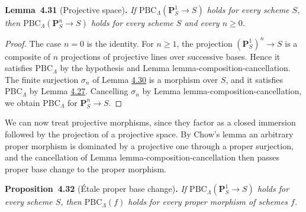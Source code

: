 \documentclass[11pt]{article}
\newenvironment{bpstatement}[2]{\par\addvspace{0.6\baselineskip}\noindent\textbf{#1}#2\textbf{.}\enspace\ignorespaces}
  {\par\addvspace{0.4\baselineskip}}
\newenvironment{bpstatementit}[2]{\begin{bpstatement}{#1}{#2}\itshape\ignorespaces}{\end{bpstatement}}
\begin{document}
\label{bp91}%
\begin{bpstatementit}{Lemma~4.31}{ (Projective space)}
If \(\mathrm{PBC}_\Lambda(\mathbf P^1_S\to S)\) holds for every scheme \(S\), then \(\mathrm{PBC}_\Lambda(\mathbf P^n_S\to S)\) holds for every scheme \(S\) and every \(n\geq0\).
\end{bpstatementit}

\begin{proof}[{Proof}]\label{bp92}%
The case \(n=0\) is the identity. For \(n\geq1\), the projection \((\mathbf P^1_S)^n\to S\) is a composite of \(n\) projections of projective lines over successive bases. Hence it satisfies \(\mathrm{PBC}_\Lambda\) by the hypothesis and Lemma lemma-composition-cancellation. The finite surjection \(\sigma_n\) of Lemma \hyperref[bp88]{4.30} is a morphism over \(S\), and it satisfies \(\mathrm{PBC}_\Lambda\) by Lemma \hyperref[bp80]{4.27}. Cancelling \(\sigma_n\) by Lemma lemma-composition-cancellation, we obtain \(\mathrm{PBC}_\Lambda\) for \(\mathbf P^n_S\to S\).
\end{proof}

\label{bp93}%
We can now treat projective morphisms, since they factor as a closed immersion followed by the projection of a projective space. By Chow's lemma an arbitrary proper morphism is dominated by a projective one through a proper surjection, and the cancellation of Lemma lemma-composition-cancellation then passes proper base change to the proper morphism.

\label{bp94}%
\begin{bpstatementit}{Proposition~4.32}{ (Étale proper base change)}
If \(\mathrm{PBC}_\Lambda(\mathbf P^1_S\to S)\) holds for every scheme \(S\), then \(\mathrm{PBC}_\Lambda(f)\) holds for every proper morphism of schemes \(f\).
\end{bpstatementit}
\end{document}
